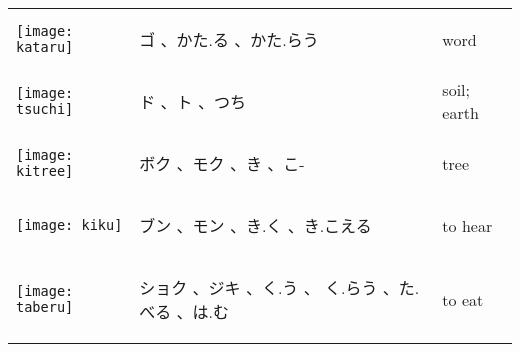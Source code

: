 \documentclass[a4paper,12pt]{extarticle}
\begin{document}
\begin{longtable}{|lp{6cm}p{4cm}|}
\begin{minipage}{0.3\textwidth}
\centerline{
	\texttt{[image: kataru]}
}
\end{minipage}
&
\begin{CJK}{UTF8}{min} ゴ 、かた.る 、かた.らう\end{CJK}
&
 word
\\ 
\begin{minipage}{0.3\textwidth}
\centerline{
	\texttt{[image: tsuchi]}
}
\end{minipage}
&
\begin{CJK}{UTF8}{min} ド 、ト 、つち\end{CJK}
&
 soil; earth
\\ 
\begin{minipage}{0.3\textwidth}
\centerline{
	\texttt{[image: kitree]}
}
\end{minipage}
&
\begin{CJK}{UTF8}{min} ボク 、モク 、き 、こ-\end{CJK}
&
 tree
\\ 
\begin{minipage}{0.3\textwidth}
\centerline{
	\texttt{[image: kiku]}
}
\end{minipage}
&
\begin{CJK}{UTF8}{min} ブン 、モン 、き.く 、き.こえる\end{CJK}
&
 to hear
\\ 
\begin{minipage}{0.3\textwidth}
\centerline{
	\texttt{[image: taberu]}
}
\end{minipage}
&
\begin{CJK}{UTF8}{min} ショク 、ジキ 、く.う 、 く.らう 、た.べる 、は.む\end{CJK}
&
 to eat
\\ 

\end{longtable}
\end{document}
